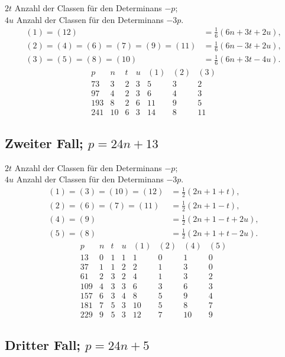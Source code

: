 \documentclass[12pt]{article}
\begin{document}
$2t$ Anzahl der Classen für den Determinans $-p$;\\
$4u$ Anzahl der Classen für den Determinans $-3p$.
\[
\begin{aligned}
(1)=(12)&=\frac16(6n+3t+2u),\\
(2)=(4)=(6)=(7)=(9)=(11)&=\frac16(6n-3t+2u),\\
(3)=(5)=(8)=(10)&=\frac16(6n+3t-4u).
\end{aligned}
\]
\[
\begin{array}{r|r|r|r|r|r|r}
p&n&t&u&(1)&(2)&(3)\\\hline
73&3&2&3&5&3&2\\
97&4&2&3&6&4&3\\
193&8&2&6&11&9&5\\
241&10&6&3&14&8&11
\end{array}
\]

\subsection*{Zweiter Fall; \(p=24n+13\)}

$2t$ Anzahl der Classen für den Determinans $-p$;\\
$4u$ Anzahl der Classen für den Determinans $-3p$.
\[
\begin{aligned}
(1)=(3)=(10)=(12)&=\frac12(2n+1+t),\\
(2)=(6)=(7)=(11)&=\frac12(2n+1-t),\\
(4)=(9)&=\frac12(2n+1-t+2u),\\
(5)=(8)&=\frac12(2n+1+t-2u).
\end{aligned}
\]
\[
\begin{array}{r|r|r|r|r|r|r|r}
p&n&t&u&(1)&(2)&(4)&(5)\\\hline
13&0&1&1&1&0&1&0\\
37&1&1&2&2&1&3&0\\
61&2&3&2&4&1&3&2\\
109&4&3&3&6&3&6&3\\
157&6&3&4&8&5&9&4\\
181&7&5&3&10&5&8&7\\
229&9&5&3&12&7&10&9
\end{array}
\]

\subsection*{Dritter Fall; \(p=24n+5\)}
\end{document}
